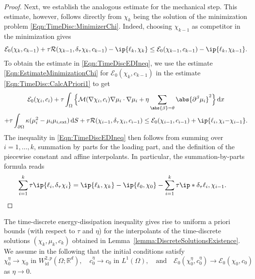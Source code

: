 \documentclass[a4paper,12pt]{article}
\newcommand{\ext}{\mathrm{ext}}
\newcommand{\R}{\mathbb{R}}
\newcommand{\calM}{\mathcal{M}}
\newcommand{\pl}{\partial}
\newcommand{\dd}{\mathrm{\,d}}
\newcommand{\dS}{\mathrm{\,d}S}
\newcommand{\id}{\mathrm{id}}
\newcommand{\calE}{\mathcal{E}}
\newcommand{\calR}{\mathcal{R}}
\theoremstyle{plain}
\theoremstyle{definition}
\numberwithin{equation}{section}
\begin{document}
\begin{proof}
Next, we establish the analogous estimate for the mechanical step. This estimate, however, follows directly from  $\chi_k$ being the solution of the minimization problem \eqref{Eqn:TimeDisc:MinimizerChi}. Indeed, choosing $\chi_{k-1}$ as competitor in the minimization gives 
\begin{equation}\label{Eqn:EstimateMinimizationChi}
\calE_0(\chi_k,c_{k-1})  +
	\tau\calR(\chi_{k-1},\delta_\tau\chi_k,c_{k-1}) -\ip{\ell_k,\chi_k}
	\leq \calE_0(\chi_{k-1},c_{k-1})-\ip{\ell_k,\chi_{k-1}}.
\end{equation}
To obtain the estimate in \eqref{Eqn:TimeDiscEDIneq}, we use the estimate \eqref{Eqn:EstimateMinimizationChi} for $\calE_0(\chi_k,c_{k-1})$ in the estimate \eqref{Eqn:TimeDisc:CalcAPriori1} to get
\begin{multline*}
\mathcal{E}_0(\chi_i,c_i)  +\tau\int_\Omega\Big\{ \calM(\nabla\chi_{i},c_{i})\nabla\mu_i\cdot\nabla\mu_i
+\eta\sum_{\abs{\beta}=\theta}\abs{\pl^\beta\mu_i}^2
\Big\}\dd x
\\
+ \tau\int_{\pl\Omega}\kappa(\mu_i^2 - \mu_i\mu_{i,\ext})\dS
+	\tau\calR(\chi_{i-1},\delta_\tau\chi_i,c_{i-1}) 
	\leq \calE_0(\chi_{i-1},c_{i-1})+\ip{\ell_i,\chi_i{-}\chi_{i-1}}.
\end{multline*}
The inequality in \eqref{Eqn:TimeDiscEDIneq} then follows from summing over $i=1,\ldots, k$, summation by parts for the loading part, and the definition of the piecewise constant and affine interpolants. In particular, the summation-by-parts formula reads
 \begin{align*}
\sum_{i=1}^k \tau\ip{\ell_i,\delta_\tau \chi_i} &= \ip{\ell_k,\chi_k}-\ip{\ell_0,\chi_0} - \sum_{i=1}^{k}\tau \ip*{\delta_\tau \ell_{i},\chi_{i-1}}.
\end{align*}
\end{proof}    

The time-discrete energy-dissipation inequality gives rise to uniform a priori bounds (with respect to $\tau$ and $\eta$)
for the interpolants of the time-discrete solutions $(\chi_k,\mu_k,c_k)$ obtained in Lemma~\ref{lemma:DiscreteSolutionsExistence}.
We assume in the following that the initial conditions satisfy 
\begin{equation}\label{Eqn:ConvInitialCond}
\chi_0^\eta \to \chi_0\text{ in }W_\id^{2,p}(\Omega;\R^d),\quad c_0^\eta \to c_0\text{ in }L^1(\Omega),\quad\text{and}\quad\calE_0(\chi_0^\eta,c_0^\eta) \to \calE_0(\chi_0,c_0)
\end{equation}
 as $\eta\to 0$.
 
\end{document}
